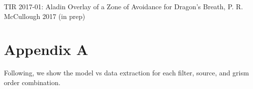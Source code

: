 \documentclass[12pt]{article}
\begin{document}
TIR 2017-01: Aladin Overlay of a Zone of Avoidance for Dragon's Breath, P. R. McCullough 2017 (in prep)



\newpage
\section{Appendix A}

Following, we show the model vs data extraction for each filter, source, and grism order combination.




\clearpage
\end{document}
